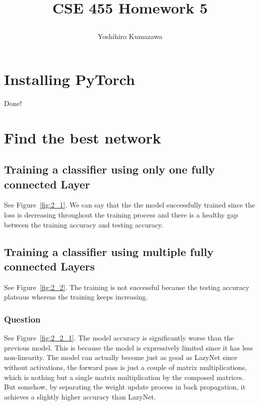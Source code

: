 \documentclass[12pt]{article}
\title{
  \vspace{-2cm}
  CSE 455 Homework 5 \\
  \author{Yoshihiro Kumazawa}
}
\begin{document}
\maketitle

\section{Installing PyTorch}
Done!

\section{Find the best network}
\subsection{Training a classifier using only one fully connected Layer}
See Figure~\ref{fig:2_1}. We can say that the the model successfully trained since the loss is decreasing throughout the training process and there is a healthy gap between the training accuracy and testing accuracy.

\subsection{Training a classifier using multiple fully connected Layers}
See Figure~\ref{fig:2_2}. The training is not successful because the testing accuracy plateaus whereas the training keeps increasing.

\subsubsection{Question}
See Figure~\ref{fig:2_2_1}. The model accuracy is significantly worse than the previous model. This is because the model is expressively limited since it has less non-linearity. The model can actually become just as good as LazyNet since without activations, the forward pass is just a couple of matrix multiplications, which is nothing but a single matrix multiplication by the composed matrices. But somehow, by separating the weight update process in back propagation, it achieves a slightly higher accuracy than LazyNet.
\end{document}
